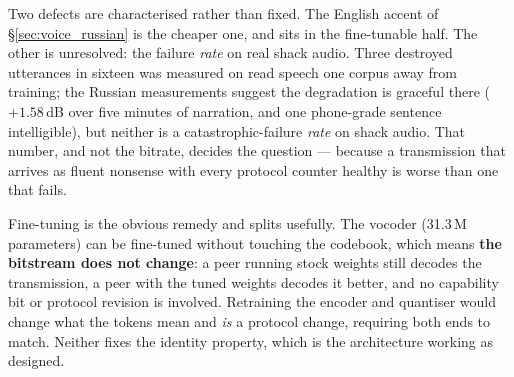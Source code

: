 Two defects are characterised rather than fixed.  The English accent of
\S\ref{sec:voice_russian} is the cheaper one, and sits in the
fine-tunable half.  The other is unresolved: the failure \emph{rate} on
real shack audio.
Three destroyed utterances in sixteen was measured on read speech one
corpus away from training; the Russian measurements suggest the
degradation is graceful there ($+1.58$\,dB over five minutes of
narration, and one phone-grade sentence intelligible), but neither is
a catastrophic-failure \emph{rate} on shack audio.  That number, and
not the bitrate, decides the question ---
because a transmission that arrives as fluent nonsense with every
protocol counter healthy is worse than one that fails.

Fine-tuning is the obvious remedy and splits usefully.  The
vocoder (31.3\,M parameters) can be fine-tuned without touching the
codebook, which means \textbf{the bitstream does not change}: a peer
running stock weights still decodes the transmission, a peer with the
tuned weights decodes it better, and no capability bit or protocol
revision is involved.  Retraining the encoder and quantiser would
change what the tokens mean and \emph{is} a protocol change, requiring
both ends to match.  Neither fixes the identity property, which is the
architecture working as designed.
